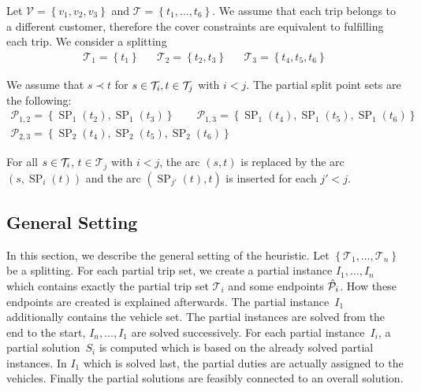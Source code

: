 \begin{example}
\label{ex:splitting_1}

Let ${\mathcal{V}=\left\{v_1,v_2,v_3\right\}}$ and ${\mathcal{T}=\left\{t_1,\dots,t_6\right\}}$. We assume that each trip belongs to a different customer, therefore the cover constraints are equivalent to fulfilling each trip. We consider a splitting
\begin{align*}
	\mathcal{T}_1=\left\{t_1\right\} && \mathcal{T}_2=\left\{t_2,t_3\right\} && \mathcal{T}_3=\left\{t_4,t_5,t_6\right\}
\end{align*}

We assume that ${s\prec t}$ for ${s\in\mathcal{T}_i}, {t\in\mathcal{T}_j}$ with ${i<j}$. The partial split point sets are the following:
\begin{gather*}
	\mathcal{P}_{1,2} = \left\{\operatorname{SP}_1\left(t_2\right), \operatorname{SP}_1\left(t_3\right)\right\}
	\qquad \mathcal{P}_{1,3} = \left\{\operatorname{SP}_1\left(t_4\right),\operatorname{SP}_1\left(t_5\right),\operatorname{SP}_1\left(t_6\right)\right\} \\
	\mathcal{P}_{2,3} = \left\{\operatorname{SP}_2\left(t_4\right),\operatorname{SP}_2\left(t_5\right),\operatorname{SP}_2\left(t_6\right)\right\}
\end{gather*}

For all ${s\in\mathcal{T}_i}$, ${t\in\mathcal{T}_j}$ with ${i<j}$, the arc $(s,t)$ is replaced by the arc $\left(s,\operatorname{SP}_i(t)\right)$ and the arc $\left(\operatorname{SP}_{j'}(t),t\right)$ is inserted for each ${j'<j}$.

\end{example}


\subsection{General Setting}
\label{sec:general_setting}

In this section, we describe the general setting of the heuristic. Let $\left\{\mathcal{T}_1,\dots,\mathcal{T}_n\right\}$ be a splitting. For each partial trip set, we create a partial instance ${I_1,\dots,I_n}$ which contains exactly the partial trip set $\mathcal{T}_i$ and some endpoints $\hat{\mathcal{P}}_i$. How these endpoints are created is explained afterwards. The partial instance~$I_1$ additionally contains the vehicle set. The partial instances are solved from the end to the start, \ie ${I_n,\dots,I_1}$ are solved successively. For each partial instance~$I_i$, a partial solution~$S_i$ is computed which is based on the already solved partial instances. In $I_1$ which is solved last, the partial duties are actually assigned to the vehicles. Finally the partial solutions are feasibly connected to an overall solution.

